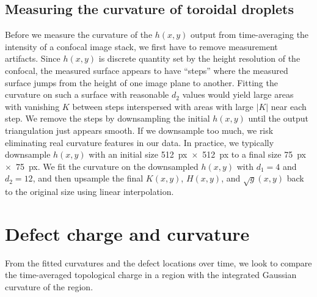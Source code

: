 \subsection{Measuring the curvature of toroidal droplets}
Before we measure the curvature of the $h(x,y)$ output from time-averaging the intensity of a confocal image stack, we first have to remove measurement artifacts.
Since $h(x,y)$ is discrete quantity set by the height resolution of the confocal, the measured surface appears to have ``steps'' where the measured surface jumps from the height of one image plane to another.
Fitting the curvature on such a surface with reasonable $d_2$ values would yield large areas with vanishing $K$ between steps interspersed with areas with large $|K|$ near each step.
We remove the steps by downsampling the initial $h(x,y)$ until the output triangulation just appears smooth.
If we downsample too much, we risk eliminating real curvature features in our data.
In practice, we typically downsample $h(x,y)$ with an initial size 512~px~$\times$~512~px to a final size 75~px~$\times$~75~px.
We fit the curvature on the downsampled $h(x,y)$ with $d_1 = 4$ and $d_2 = 12$, and then upsample the final $K(x,y)$, $H(x,y)$, and $\sqrt{g}(x,y)$ back to the original size using linear interpolation.




\section{Defect charge and curvature}
From the fitted curvatures and the defect locations over time, we look to compare the time-averaged topological charge in a region with the integrated Gaussian curvature of the region.


